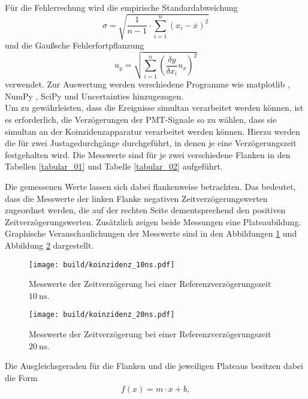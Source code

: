 \noindent Für die Fehlerrechung wird die empirische Standardabweichung
\begin{equation}
  \sigma = \sqrt{\frac{1}{n-1} \cdot \sum_{i=1}^n(x_i-\overline{x})^2}
  \label{eqn:Stdabweichung}
\end{equation}
und die Gaußsche Fehlerfortpflanzung
\begin{equation}
  u_y = \sqrt{\sum_{i=1}^n\left(\frac{\delta y}{\delta x_i}u_x\right)^2}
  \label{eqn:gauß}
\end{equation}
verwendet. Zur Auswertung werden verschiedene Programme wie matplotlib
\cite{matplotlib}, NumPy \cite{numpy}, SciPy \cite{scipy} und Uncertainties
\cite{uncertainties} hinzugezogen. \\
\newline
\noindent Um zu gewährleisten, dass die Ereignisse simultan verarbeitet werden
können, ist es erforderlich, die Verzögerungen der PMT-Signale so zu wählen, dass
sie simultan an der Koinzidenzapparatur verarbeitet werden können. Hierzu werden
die für zwei Justagedurchgänge durchgeführt, in denen je eine Verzögerungszeit
festgehalten wird. Die Messwerte sind für je zwei verschiedene Flanken in den
Tabellen \ref{tabular_01} und Tabelle \ref{tabular_02} aufgeführt. \\
\FloatBarrier

\FloatBarrier
\FloatBarrier

\FloatBarrier
\noindent Die gemessenen Werte lassen sich dabei flankenweise betrachten. Das
bedeutet, dass die Messwerte der linken Flanke negativen Zeitverzögerungswerten
zugeordnet werden, die auf der rechten Seite dementsprechend den positiven
Zeitverzögerungswerten. Zusätzlich zeigen beide Messungen eine Plateaubildung.
Graphische Veranschaulichungen der Messwerte sind in den Abbildungen \ref{fig:04}
und Abbildung \ref{fig:05} dargestellt.
\FloatBarrier
\begin{figure}
  \centering
  \texttt{[image: build/koinzidenz\_10ns.pdf]}
  \caption{Messwerte der Zeitverzögerung bei einer Referenzverzögerungszeit $\SI{10}{\nano\second}$.}
  \label{fig:04}
\end{figure}
\FloatBarrier
\FloatBarrier
\begin{figure}
  \centering
  \texttt{[image: build/koinzidenz\_20ns.pdf]}
  \caption{Messwerte der Zeitverzögerung bei einer Referenzverzögerungszeit $\SI{20}{\nano\second}$.}
  \label{fig:05}
\end{figure}
\FloatBarrier
\noindent Die Ausgleichsgeraden für die Flanken und die jeweiligen Plateaus
besitzen dabei die Form
\begin{align}
  f(x) = m \cdot x + b,
  \label{eqn:08}
\end{align}
